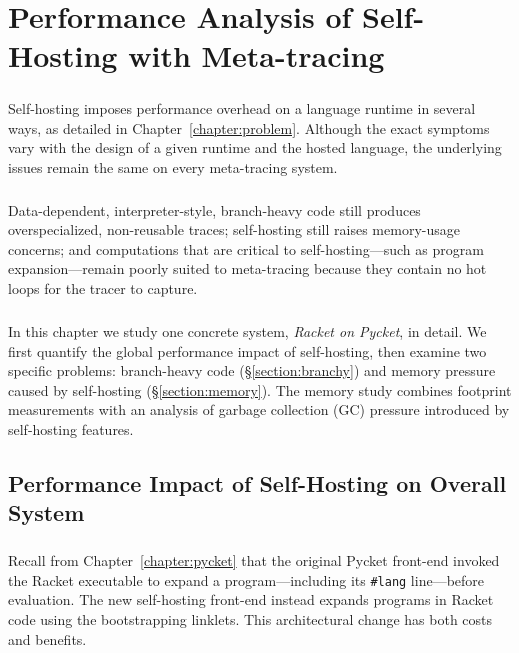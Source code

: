 \chapter{Performance Analysis of Self-Hosting with Meta-tracing}

	\paragraph{}%
	 Self-hosting imposes performance overhead on a language runtime in several ways, as detailed in Chapter~\ref{chapter:problem}. Although the exact symptoms vary with the design of a given runtime and the hosted language, the underlying issues remain the same on every meta-tracing system.

	\paragraph{}%
	 Data-dependent, interpreter-style, branch-heavy code still produces overspecialized, non-reusable traces; self-hosting still raises memory-usage concerns; and computations that are critical to self-hosting—such as program expansion—remain poorly suited to meta-tracing because they contain no hot loops for the tracer to capture.

	\paragraph{}%
	 In this chapter we study one concrete system, \emph{Racket on Pycket}, in detail.  We first quantify the global performance impact of self-hosting, then examine two specific problems: branch-heavy code (\S\ref{section:branchy}) and memory pressure caused by self-hosting (\S\ref{section:memory}).  The memory study combines footprint measurements with an analysis of garbage collection (GC) pressure introduced by self-hosting features.

	\section{Performance Impact of Self-Hosting on Overall System}

		\paragraph{}%
		 Recall from Chapter~\ref{chapter:pycket} that the original Pycket front-end invoked the Racket executable to expand a program—including its \verb|#lang| line—before evaluation.  The new self-hosting front-end instead expands programs in Racket code using the bootstrapping linklets.  This architectural change has both costs and benefits.

